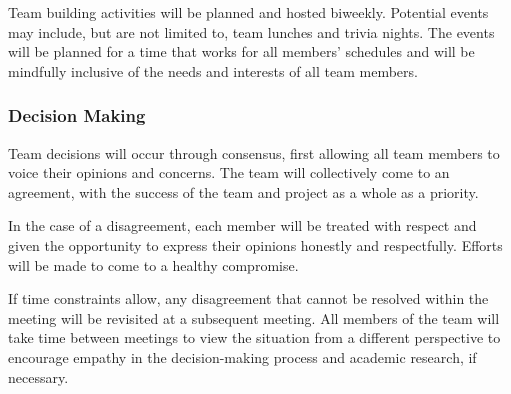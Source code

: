 \documentclass{article}
\begin{document}
Team building activities will be planned and hosted biweekly. Potential events may include, but are not limited to, team lunches and trivia nights. The events will be planned for a time that works for all members' schedules and will be mindfully inclusive of the needs and interests of all team members.

\subsubsection*{Decision Making} 

Team decisions will occur through consensus, first allowing all team members to voice their opinions and concerns. The team will collectively come to an agreement, with the success of the team and project as a whole as a priority.

In the case of a disagreement, each member will be treated with respect and given the opportunity to express their opinions honestly and respectfully. Efforts will be made to come to a healthy compromise.

If time constraints allow, any disagreement that cannot be resolved within the meeting will be revisited at a subsequent meeting. All members of the team will take time between meetings to view the situation from a different perspective to encourage empathy in the decision-making process and academic research, if necessary.
\end{document}
